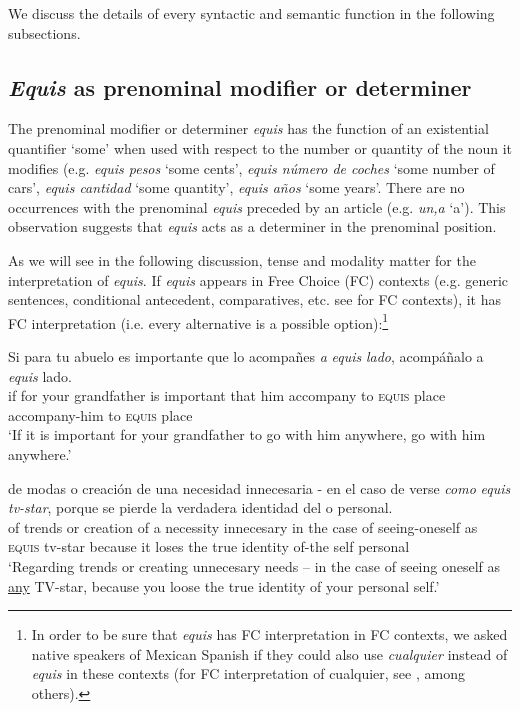 \documentclass[output=paper
,modfonts
,nonflat]{langsci/langscibook}
\begin{document}
We discuss the details of every syntactic and semantic function in the following subsections.

\subsection{\textit{Equis} as prenominal modifier or determiner}\label{sec:kellert:2.1}
The prenominal modifier or determiner \textit{equis} has the function of an existential quantifier ‘some’ when used with respect to the number or quantity of the noun it modifies (e.g. \textit{equis pesos} ‘some cents’, \textit{equis número de coches} ‘some number of cars’, \textit{equis cantidad} ‘some quantity’, \textit{equis años} ‘some years’. There are no occurrences with the prenominal \textit{equis} preceded by an article (e.g. \textit{un,a} ‘a’). This observation suggests that \textit{equis} acts as a determiner in the prenominal position.

As we will see in the following discussion, tense and modality matter for the interpretation of \textit{equis}. If \textit{equis} appears in Free Choice (FC) contexts (e.g. generic sentences, conditional antecedent, comparatives, etc. see \citealt{Aloni2010} for FC contexts), it has FC interpretation (i.e. every alternative is a possible option):\footnote{In order to be sure that \textit{equis} has FC interpretation in FC contexts, we asked native speakers of Mexican Spanish if they could also use \textit{cualquier} instead of \textit{equis} in these contexts (for FC interpretation of cualquier, see \citealt{AM2011}, among others).}

\ea
\gll Si para tu abuelo es importante que lo acompañes \textit{a} \textit{equis} \textit{lado}, acompáñalo a \textit{equis} lado.\\
if for your grandfather is important that him accompany to \textsc{equis} place accompany-him to \textsc{equis} place\\
\glt ‘If it is important for your grandfather to go with him anywhere, go with him anywhere.’
\z

\ea
\gll de modas o creación de una necesidad innecesaria - en el caso de verse \textit{como} \textit{equis} \textit{tv-star}, porque se pierde la verdadera identidad del o personal.\\
of trends or creation of a necessity innecesary {} in the case of seeing-oneself as \textsc{equis} tv-star because it	loses the true identity of-the self personal\\
\glt ‘Regarding trends or creating unnecesary needs – in the case of seeing oneself as \underline{any} TV-star, because you loose the true identity of your personal self.’
\z
\end{document}
